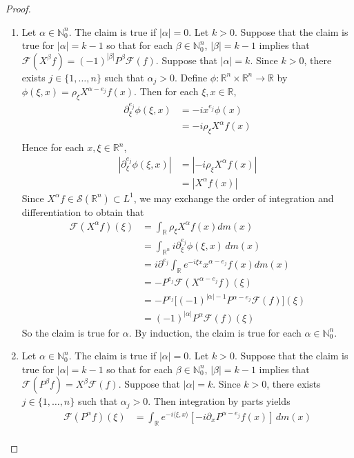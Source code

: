 \documentclass{book}
\theoremstyle{definition}
\newcommand{\al}{\alpha}
\newcommand{\be}{\beta}
\newcommand{\N}{\mathbb{N}}
\newcommand{\R}{\mathbb{R}}
\newcommand{\MF}{\mathcal{F}}
\newcommand{\MS}{\mathcal{S}}
\DeclareMathOperator*{\0}{\mbf{0}}
\DeclareMathOperator*{\1}{\mbf{1}}
\renewcommand{\r}{\rangle}
\renewcommand{\l}{\langle}
\newcommand{\p}{\partial}
\newcommand{\dm}{\, d m}
\begin{document}
	\begin{proof}\
		\begin{enumerate}
			\item Let $\al \in \N_0^n$. The claim is true if $|\al| = 0$. Let $k > 0$. Suppose that the claim is true for $|\al| = k-1$ so that for each $\be \in \N_0^n$, $|\be| = k-1$ implies that $\MF(X^{\be}f) = (-1)^{|\be|}P^{\be} \MF(f)$. Suppose that $|\al| = k$. Since $k > 0$, there exists $j \in \{1, \ldots, n\}$ such that $\al_j > 0$. Define $\phi:\R^n \times \R^n \rightarrow \R$ by $\phi(\xi, x) = \rho_{\xi} X^{\al - e_j}f(x)$. Then for each $\xi, x \in \R$, 
			\begin{align*}
				\p^{e_j}_{\xi} \phi(\xi, x)
				& = -ix^{e_j} \phi(x) \\
				& = -i \rho_{\xi} X^{\al}f(x) \\
			\end{align*}
			Hence for each $x, \xi \in \R^n$, 
			\begin{align*}
				|\p^{e_j}_{\xi} \phi(\xi, x)|
				& = |-i \rho_{\xi} X^{\al}f(x)| \\
				& = |X^{\al}f(x)|
			\end{align*}
			Since $X^{\al}f \in \MS(\R^n) \subset L^1$, we may exchange the order of integration and differentiation to obtain that
			\begin{align*}
				\MF(X^{\al}f) (\xi)
				& = \int_{\R} \rho_{\xi} X^{\al}f(x) dm(x) \\
				& = \int_{\R^n} i\p^{e_j}_{\xi} \phi(\xi, x) \dm(x) \\
				& = i \p^{e_j}  \int_{\R} e^{-i\xi x}x^{\al-e_j}f(x) dm(x)  \\
				& = -P^{e_j} \MF(X^{\al-e_j}f) (\xi) \\
				& = -P^{e_j} \bigg[ (-1)^{|\al| - 1} P^{\al - e_j} \MF(f) \bigg] (\xi) \\
				& = (-1)^{|\al|}P^{\al} \MF(f) (\xi)
			\end{align*}
			So the claim is true for $\al$. By induction, the claim is true for each $\al \in \N_0^n$.
			\item  Let $\al \in \N_0^n$. The claim is true if $|\al| = 0$. Let $k > 0$. Suppose that the claim is true for $|\al| = k-1$ so that for each $\be \in \N_0^n$, $|\be| = k-1$ implies that $\MF(P^{\be}f) = X^{\be} \MF(f)$. Suppose that $|\al| = k$. Since $k > 0$, there exists $j \in \{1, \ldots, n\}$ such that $\al_j > 0$.
			Then integration by parts yields 
			\begin{align*}
				\MF(P^{\al}f)(\xi)
				& = \int_{\R} e^{-i \l \xi , x \r} [-i \p_x P^{\al-e_j}f(x)] \dm(x) \\

\end{align*}
\end{enumerate}
\end{proof}
\end{document}
